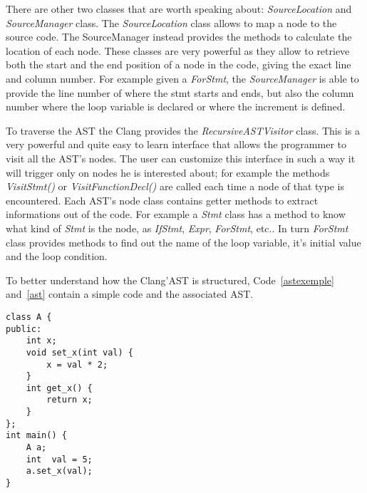 \documentclass[a4paper,11pt,oneside]{book}
\begin{document}
There are other two classes that are worth speaking about: \emph{SourceLocation} and \emph{SourceManager} class. The \emph{SourceLocation} class allows to map a node to the source code. The SourceManager instead provides the methods to calculate the location of each node. These classes are very powerful as they allow to retrieve both the start and the end position of a node in the code, giving the exact line and column number. For example given a \emph{ForStmt}, the \emph{SourceManager} is able to provide the line number of where the stmt starts and ends, but also the column number where the loop variable is declared or where the increment is defined.

To traverse the AST the Clang provides the \emph{RecursiveASTVisitor} class. This is a very powerful and quite easy to learn interface that allows the programmer to visit all the AST’s nodes. The user can customize this interface in such a way it will trigger only on nodes he is interested about; for example the methods \emph{VisitStmt()} or \emph{VisitFunctionDecl()} are called each time a node of that type is encountered. Each AST’s node class contains getter methods to extract informations out of the code. For example a \emph{Stmt} class has a method to know what kind of \emph{Stmt} is the node, as \emph{IfStmt}, \emph{Expr}, \emph{ForStmt}, etc.. In turn \emph{ForStmt} class provides methods to find out the name of the loop variable, it’s initial value and the loop condition.

To better understand how the Clang’AST is structured, Code~\ref{astexemple} and~\ref{ast} contain a simple code and the associated AST.
\newline
\begin{lstlisting}[language=CCC, caption=Simple code., label=astexemple]
class A {
public:
	int x;
	void set_x(int val) {
		x = val * 2;
	}	
	int get_x() {
		return x;
	}
};
int main() {
	A a;
	int  val = 5;
	a.set_x(val);
}
\end{lstlisting}
\end{document}
